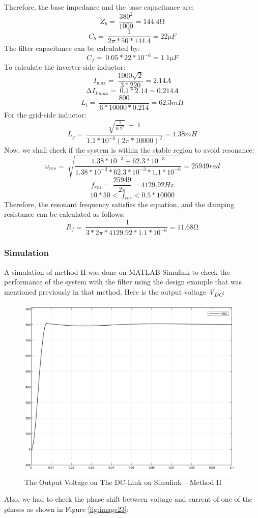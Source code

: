 \documentclass[12pt,a4paper]{book}
\begin{document}
Therefore, the base impedance and the base capacitance are:
\[Z_{b} = \ \frac{380^{2}}{1000} = 144.4\mathrm{\Omega}\]
\[C_{b} = \ \frac{1}{2\pi*50*144.4} = 22\mathrm{\mu}F\]
The filter capacitance can be calculated by:
\[C_{f} = \ 0.05*22*10^{- 6} = 1.1\mathrm{\mu}F\]
To calculate the inverter-side inductor:
\[I_{\max} = \ \frac{1000\sqrt{2}}{3*220} = 2.14A\]
\[{\mathrm{\Delta}I}_{Lmax} = \ 0.1*2.14 = 0.214A\]
\[L_{i} = \ \frac{800}{6*10000*0.214} = 62.3mH\]
For the grid-side inductor:
\[L_{g} = \ \frac{\sqrt{\frac{1}{{0.2}^{2}}}\  + \ 1}{1.1*10^{- 6}{(2\pi*10000)}^{2}} = 1.38mH\]
Now, we shall check if the system is within the stable region to avoid resonance:
\[\omega_{res} = \ \sqrt{\frac{1.38*10^{- 3} + 62.3*10^{- 3}}{1.38*10^{- 3}*62.3*10^{- 3}*1.1*10^{- 6}}} = 25949rad\]
\[f_{res} = \ \frac{25949}{2\pi} = 4129.92Hz\]
\[10*50 < \ f_{res} < 0.5*10000\]
Therefore, the resonant frequency satisfies the equation, and the damping resistance can be calculated as follows:
\[R_{f} = \ \frac{\ 1}{3*2\pi*4129.92*1.1*10^{- 6}} = 11.68\mathrm{\Omega}\]

\subsubsection{Simulation}
A simulation of method II was done on MATLAB-Simulink to check the performance of the system with the filter using the design example that was mentioned previously in that method. Here is the output voltage \emph{V\textsubscript{DC}}:

\begin{figure}[h!]
  \centering
  \includegraphics[width=11cm]{image22.png}
  \caption{The Output Voltage on The DC-Link on Simulink -- Method II}
  \label{fig:image22}
\end{figure}
Also, we had to check the phase shift between voltage and current of one of the phases as shown in Figure \ref{fig:image23}:
\end{document}
